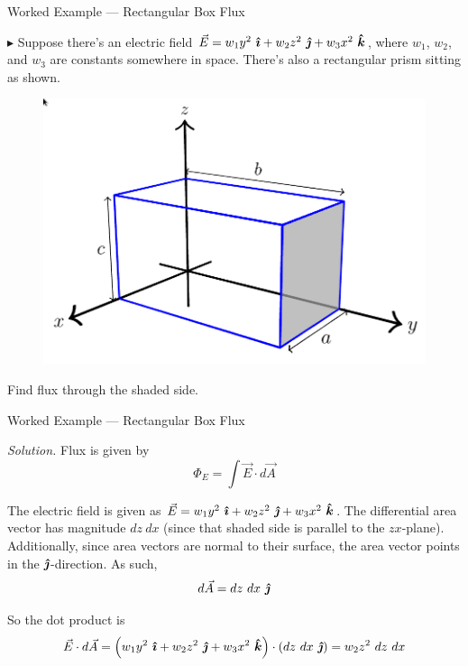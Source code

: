 \documentclass{beamer}
\begin{document}
\begin{frame}{Worked Example --- Rectangular Box Flux}

$\blacktriangleright$ Suppose there's an electric field $\vec{E} = w_1 y^2\ \bm{\hat{\imath}} + w_2 z^2\ \bm{\hat{\jmath}} + w_3 x^2\ \bm{\hat{k}}$, where $w_1$, $w_2$, and $w_3$ are constants somewhere in space. There's also a rectangular prism sitting as shown.

\begin{figure}
\centering
\includegraphics[height=0.5\textheight]{figures/box_flux.png}
\end{figure}

Find flux through the shaded side.
    
\end{frame}

\begin{frame}{Worked Example --- Rectangular Box Flux}

\textit{Solution.} Flux is given by
\begin{equation*}
    \Phi_E = \int \vec{E} \cdot d\vec{A}
\end{equation*}

The electric field is given as $\vec{E} = w_1 y^2\ \bm{\hat{\imath}} + w_2 z^2\ \bm{\hat{\jmath}} + w_3 x^2\ \bm{\hat{k}}$. The differential area vector has magnitude $dz\ dx$ (since that shaded side is parallel to the $zx$-plane). Additionally, since area vectors are normal to their surface, the area vector points in the $\bm{\hat{\jmath}}$-direction. As such,
\begin{equation*}
    d\vec{A} = dz\ dx\ \jhat
\end{equation*}

So the dot product is
\begin{equation*}
    \vec{E} \cdot d\vec{A} = \left( w_1 y^2\ \ihat + w_2 z^2\ \jhat + w_3 x^2\ \khat \right) \cdot \left( dz\ dx\ \jhat \right) = w_2 z^2\ dz\ dx
\end{equation*}

\end{frame}
\end{document}
